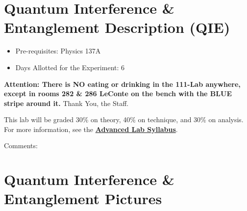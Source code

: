 \documentclass{../lab}
\begin{document}
\maketitle

\tableofcontents

\section{Quantum Interference \& Entanglement Description (QIE)}

\begin{itemize}
    \item Pre-requisites: Physics 137A

    \item Days Allotted for the Experiment: 6

\end{itemize}

\textbf{Attention: There is NO eating or drinking in the 111-Lab anywhere, except in rooms 282 \& 286 LeConte on the bench with the BLUE stripe around it.} Thank You, the Staff.

This lab will be graded 30\% on theory, 40\% on technique, and 30\% on analysis. For more information, see the \href{http://experimentationlab.berkeley.edu/syllabus}{\textbf{Advanced Lab Syllabus}}.

Comments: \Feedback

\section{Quantum Interference \& Entanglement Pictures}
\end{document}
